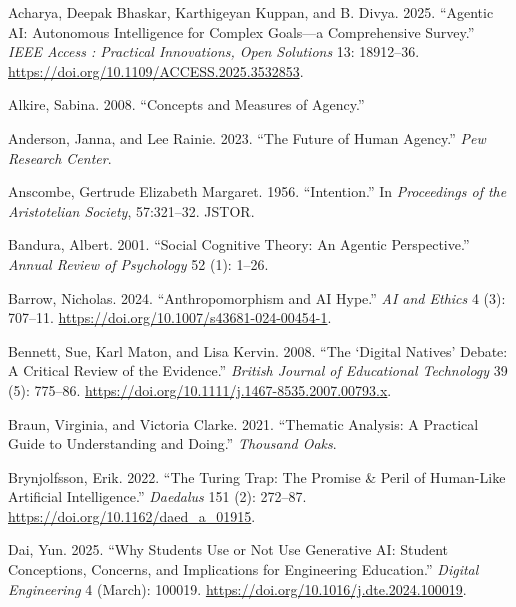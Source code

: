 \documentclass[
  letterpaper,
  DIV=11,
  numbers=noendperiod]{scrartcl}
\newlength{\cslhangindent}
\newenvironment{CSLReferences}[2] %
 {\begin{list}{}{%
  \setlength{\itemindent}{0pt}
  \setlength{\leftmargin}{0pt}
  \setlength{\parsep}{0pt}
  \ifodd #1
   \setlength{\leftmargin}{\cslhangindent}
   \setlength{\itemindent}{-1\cslhangindent}
  \fi
  \setlength{\itemsep}{#2\baselineskip}}}
 {\end{list}}
\begin{document}
\label{refs}
\begin{CSLReferences}{1}{0}
Acharya, Deepak Bhaskar, Karthigeyan Kuppan, and B. Divya. 2025.
{``Agentic {AI}: {Autonomous} Intelligence for Complex Goals---a
Comprehensive Survey.''} \emph{IEEE Access : Practical Innovations, Open
Solutions} 13: 18912--36.
\url{https://doi.org/10.1109/ACCESS.2025.3532853}.

Alkire, Sabina. 2008. {``Concepts and Measures of Agency.''}

Anderson, Janna, and Lee Rainie. 2023. {``The {Future} of {Human
Agency}.''} \emph{Pew Research Center}.

Anscombe, Gertrude Elizabeth Margaret. 1956. {``Intention.''} In
\emph{Proceedings of the Aristotelian Society}, 57:321--32. JSTOR.

Bandura, Albert. 2001. {``Social Cognitive Theory: {An} Agentic
Perspective.''} \emph{Annual Review of Psychology} 52 (1): 1--26.

Barrow, Nicholas. 2024. {``Anthropomorphism and {AI} Hype.''} \emph{AI
and Ethics} 4 (3): 707--11.
\url{https://doi.org/10.1007/s43681-024-00454-1}.

Bennett, Sue, Karl Maton, and Lisa Kervin. 2008. {``The {`Digital
Natives'} Debate: {A} Critical Review of the Evidence.''} \emph{British
Journal of Educational Technology} 39 (5): 775--86.
\url{https://doi.org/10.1111/j.1467-8535.2007.00793.x}.

Braun, Virginia, and Victoria Clarke. 2021. {``Thematic Analysis: A
Practical Guide to Understanding and Doing.''} \emph{Thousand Oaks}.

Brynjolfsson, Erik. 2022. {``The {Turing Trap}: {The Promise} \& {Peril}
of {Human-Like Artificial Intelligence}.''} \emph{Daedalus} 151 (2):
272--87. \url{https://doi.org/10.1162/daed_a_01915}.

Dai, Yun. 2025. {``Why Students Use or Not Use Generative {AI}:
{Student} Conceptions, Concerns, and Implications for Engineering
Education.''} \emph{Digital Engineering} 4 (March): 100019.
\url{https://doi.org/10.1016/j.dte.2024.100019}.


\end{CSLReferences}
\end{document}
